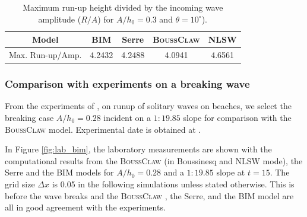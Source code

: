 \documentclass[review]{elsarticle}
\newcommand{\BoussClaw}{\textsc{BoussClaw} }
\begin{document}
\begin{table}[!htb]
	\begin{tabular}{c|cccc} \hline
		Model & BIM & Serre & \BoussClaw & NLSW \\ \hline
		Max. Run-up/Amp. & 4.2432 & 4.2488 & 4.0941 & 4.6561 \\
		\hline
	\end{tabular}
	\caption{Maximum run-up height divided by the incoming wave amplitude ($R/A$) for
$A/h_0=0.3$ and $\theta=10^\circ$).}
    \label{tab:runup_slope10}
\end{table}

 
\subsubsection{Comparison with experiments on a breaking wave}
\label{sec:wave_break}

From the experiments of \citet{synolakis1987runup}, on runup of solitary
waves on beaches, we select the breaking case $A/h_0=0.28$ 
incident on  a  $1:19.85$ slope for comparison with the \BoussClaw model. 
Experimental date is obtained at \cite{synolakis2007standards}.



In Figure \ref{fig:lab_bim}, the laboratory measurements
are shown with the computational results from the \BoussClaw (in Boussinesq and  NLSW mode),  the Serre and the BIM models
for $A/h_0=0.28$ and a $1:19.85$ slope at $t=15$. 
The grid size $\Delta x$ is 0.05 in the following simulations
unless stated otherwise.
This is before the wave breaks and
the \BoussClaw, the Serre, and the  BIM model are all in good agreement with the experiments.
\end{document}
